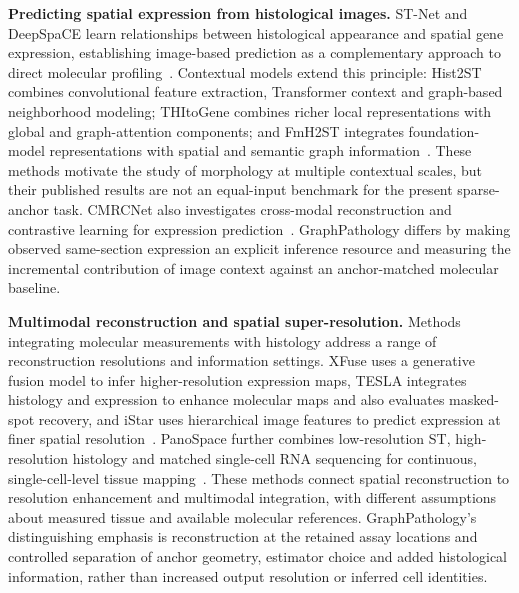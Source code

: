 \noindent\textbf{Predicting spatial expression from histological images.}
ST-Net and DeepSpaCE learn relationships between histological appearance and spatial gene expression, establishing image-based prediction as a complementary approach to direct molecular profiling~\cite{he2020,monjo2022}. Contextual models extend this principle: Hist2ST combines convolutional feature extraction, Transformer context and graph-based neighborhood modeling; THItoGene combines richer local representations with global and graph-attention components; and FmH2ST integrates foundation-model representations with spatial and semantic graph information~\cite{hist2st2022,thitogene2024,fmh2st2025}. These methods motivate the study of morphology at multiple contextual scales, but their published results are not an equal-input benchmark for the present sparse-anchor task. CMRCNet also investigates cross-modal reconstruction and contrastive learning for expression prediction~\cite{liu2026}. GraphPathology differs by making observed same-section expression an explicit inference resource and measuring the incremental contribution of image context against an anchor-matched molecular baseline.

\noindent\textbf{Multimodal reconstruction and spatial super-resolution.}
Methods integrating molecular measurements with histology address a range of reconstruction resolutions and information settings. XFuse uses a generative fusion model to infer higher-resolution expression maps, TESLA integrates histology and expression to enhance molecular maps and also evaluates masked-spot recovery, and iStar uses hierarchical image features to predict expression at finer spatial resolution~\cite{bergenstrahle2022,tesla2023,istar2024}. PanoSpace further combines low-resolution ST, high-resolution histology and matched single-cell RNA sequencing for continuous, single-cell-level tissue mapping~\cite{panospace2026}. These methods connect spatial reconstruction to resolution enhancement and multimodal integration, with different assumptions about measured tissue and available molecular references. GraphPathology's distinguishing emphasis is reconstruction at the retained assay locations and controlled separation of anchor geometry, estimator choice and added histological information, rather than increased output resolution or inferred cell identities.

